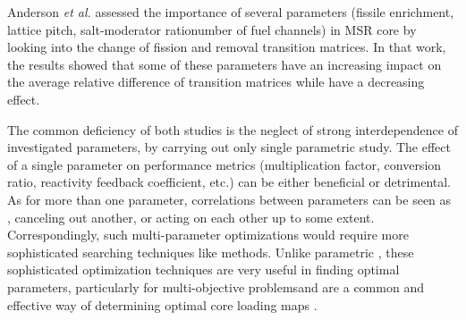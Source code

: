     Anderson \emph{et al.} \cite{Anderson2019} assessed the importance of several parameters (fissile enrichment, lattice pitch, salt-moderator ratio\DIFdelbegin {}\DIFdelend \DIFaddbegin {}\DIFaddend number of fuel channels) in \DIFdelbegin {}\DIFdelend \DIFaddbegin {}\DIFaddend \gls{MSR} core by looking into the change of \DIFdelbegin {}\DIFdelend fission and removal transition matrices. In that work, the results showed that some of these parameters have an increasing impact on the average relative difference of transition matrices while \DIFdelbegin {}\DIFdelend \DIFaddbegin {}\DIFaddend have a decreasing effect.

    The common deficiency of both studies is the neglect of strong interdependence of \DIFdelbegin {}\DIFdelend \DIFaddbegin {}\DIFaddend investigated parameters, by carrying out only \DIFaddbegin {}\DIFaddend single parametric study. The effect of a single parameter on performance metrics (multiplication factor, conversion ratio, reactivity feedback coefficient, etc.) can be either beneficial or detrimental. As for more than one parameter, correlations between parameters can be seen as \DIFdelbegin {}\DIFdelend \DIFaddbegin {}\DIFaddend , canceling out another, or acting on each other up to some extent. Correspondingly, such multi-parameter optimizations would require more sophisticated searching techniques like \DIFdelbegin %
\DIFdelend \DIFaddbegin {}\DIFaddend methods. Unlike parametric \DIFdelbegin {}\DIFdelend \DIFaddbegin {}\DIFaddend , these sophisticated optimization techniques are very useful in finding optimal parameters, particularly for multi-objective problems\DIFaddbegin \DIFadd{, }\DIFaddend and are a common and effective way of determining optimal core loading maps \cite{Nissan2019}.

